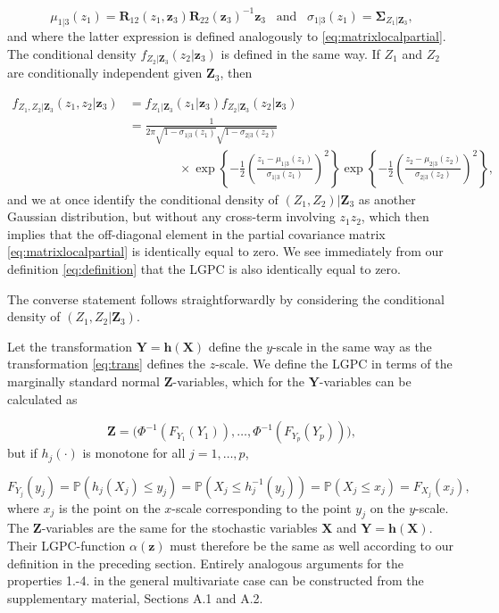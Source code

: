 \documentclass[
  12pt,
  letterpaper]{article}
\newcommand{\X}{\bm{X}}
\newcommand{\Z}{\bm{Z}}
\newcommand{\z}{\bm{z}}
\newcommand{\Y}{\bm{Y}}
\newcommand{\R}{\bm{R}}
\newcommand{\fSigma}{\bm{\Sigma}}
\theoremstyle{definition}
\theoremstyle{definition}
\theoremstyle{definition}
\theoremstyle{remark}
\begin{document}
\begin{equation}
\mu_{1|3}(z_1) = \R_{12}(z_1, \z_3)\R_{22}(\z_3)^{-1}\z_3 \,\,\, \textrm{ and } \,\,\, \sigma_{1|3}(z_1) = \fSigma_{Z_1|\Z_3},
\label{eq:localconditionalpar}
\end{equation}
and where the latter expression is defined analogously to \eqref{eq:matrixlocalpartial}. The conditional density \(f_{Z_2|\Z_3}(z_2|\z_3)\) is defined in the same way. If \(Z_1\) and \(Z_2\) are conditionally independent given \(\Z_3\), then

\begin{align*}
f_{Z_1,Z_2|\Z_3}(z_1, z_2|\z_3) &= f_{Z_1|\Z_3}(z_1|\z_3)f_{Z_2|\Z_3}(z_2|\z_3) \\
&= \frac{1}{2\pi\sqrt{1-\sigma_{1|3}(z_1)}\sqrt{1-\sigma_{2|3}(z_2)}} \\ 
&\qquad \qquad \times\exp\left\{-\frac{1}{2}\left(\frac{z_1 - \mu_{1|3}(z_1)}{\sigma_{1|3}(z_1)}\right)^2\right\}\exp\left\{-\frac{1}{2}\left(\frac{z_2 - \mu_{2|3}(z_2)}{\sigma_{2|3}(z_2)}\right)^2\right\},
\end{align*}
and we at once identify the conditional density of \((Z_1,Z_2)|\Z_3\) as another Gaussian distribution, but without any cross-term involving \(z_1z_2\), which then implies that the off-diagonal element in the partial covariance matrix \eqref{eq:matrixlocalpartial} is identically equal to zero. We see immediately from our definition \eqref{eq:definition} that the LGPC is also identically equal to zero.

The converse statement follows straightforwardly by considering the conditional density of \((Z_1, Z_2|\Z_3)\).

Let the transformation \(\Y = \bm{h}(\X)\) define the \(y\)-scale in the same way as the transformation \eqref{eq:trans} defines the \(z\)-scale. We define the LGPC in terms of the marginally standard normal \(\Z\)-variables, which for the \(\Y\)-variables can be calculated as

\[\Z = \Big(\Phi^{-1}\left(F_{Y_1}(Y_1)\right), \ldots, \Phi^{-1}\left(F_{Y_p}(Y_p)\right)\Big),\]
but if \(h_j(\cdot)\) is monotone for all \(j = 1,\ldots,p\),

\[F_{Y_j}(y_j) = \mathbb{P}(h_j(X_j) \leq y_j) = \mathbb{P}(X_j \leq h_j^{-1}(y_j)) = \mathbb{P}(X_j \leq x_j) = F_{X_j}(x_j),\]
where \(x_j\) is the point on the \(x\)-scale corresponding to the point \(y_j\) on the \(y\)-scale. The \(\Z\)-variables are the same for the stochastic variables \(\X\) and \(\Y = \bm{h}(\X)\). Their LGPC-function \(\alpha(\z)\) must therefore be the same as well according to our definition in the preceding section. Entirely analogous arguments for the properties 1.-4. in the general multivariate case can be constructed from the supplementary material, Sections A.1 and A.2.
\end{document}
